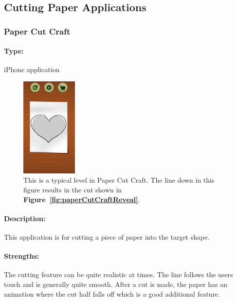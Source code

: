 \documentclass[11pt]{article}
\begin{document}
        \subsection{Cutting Paper Applications}
            \subsubsection{Paper Cut Craft}
            
                \paragraph{Type:} iPhone application %
                 
                 \begin{figure}
                    \includegraphics[width=0.25\textwidth]{Images/paperCutCraftCut.png}
                    \caption{This is a typical level in Paper Cut Craft. The line down in this figure results in the cut shown in \textbf{Figure~\ref{fig:paperCutCraftReveal}}.}
                    \label{fig:paperCutCraftCut}
                \end{figure}
                
                \paragraph{Description:} This application is for cutting a piece of paper into the target shape. 
                
                
                \paragraph{Strengths:}
                The cutting feature can be quite realistic at times. The line follows the users touch and is generally quite smooth. After a cut is made, the paper has an animation where the cut half falls off which is a good additional feature.
                
\end{document}
